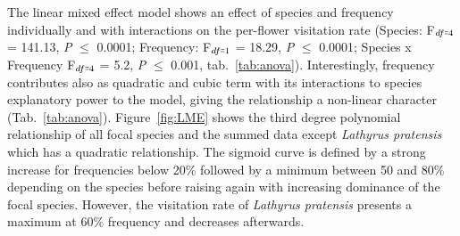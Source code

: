 The linear mixed effect model shows an effect of species and frequency individually and with interactions on the per-flower visitation rate (Species: F$_{df\shorteq4}$ = 141.13, \textit{P} $\leq$ 0.0001; Frequency: F$_{df\shorteq1}$ = 18.29, \textit{P} $\leq$ 0.0001; Species x Frequency F$_{ df\shorteq4}$ = 5.2, \textit{P} $\leq$ 0.001, tab.~\ref{tab:anova}). Interestingly, frequency contributes also as quadratic and cubic term with its interactions to species explanatory power to the model, giving the relationship a non-linear character (Tab.~\ref{tab:anova}). Figure~\ref{fig:LME} shows the third degree polynomial relationship of all focal species and the summed data except \textit{Lathyrus pratensis} which has a quadratic relationship. The sigmoid curve is defined by a strong increase for frequencies below 20\% followed by a minimum between 50 and 80\% depending on the species before raising again with increasing dominance of the focal species. However, the visitation rate of \textit{Lathyrus pratensis} presents a maximum at 60\% frequency and decreases afterwards. 




